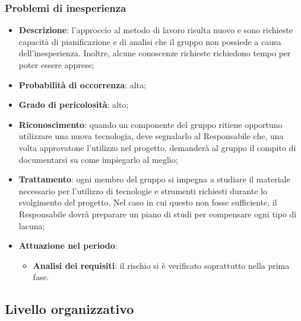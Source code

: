 		\subsubsection{Problemi di inesperienza}
		\begin{itemize}
			\item \textbf{Descrizione}: l'approccio al metodo di lavoro risulta nuovo e sono richieste capacità di pianificazione e di analisi che il gruppo non possiede a causa dell'inesperienza. Inoltre, alcune conoscenze richieste richiedono tempo per poter essere 					apprese;
			\item \textbf{Probabilità di occorrenza}: alta;
			\item \textbf{Grado di pericolosità}: alto;
			\item \textbf{Riconoscimento}: quando un componente del gruppo ritiene opportuno utilizzare una nuova tecnologia, deve segnalarlo al Responsabile che, una volta approvatone l'utilizzo nel progetto, demanderà al gruppo il compito di documentarsi su come 			impiegarlo al meglio;
			\item \textbf{Trattamento}: ogni membro del gruppo si impegna a studiare il materiale necessario per l'utilizzo di tecnologie e strumenti richiesti durante lo svolgimento del progetto. Nel caso in cui questo non fosse sufficiente, il Responsabile dovrà 						preparare un piano di studi per compensare ogni tipo di lacuna;
			\item \textbf{Attuazione nel periodo}:
			\begin{itemize}
				\item \textbf{Analisi dei requisiti}:  il rischio si è verificato soprattutto nella prima fase.
			\end{itemize}
		\end{itemize}
	\subsection{Livello organizzativo}
